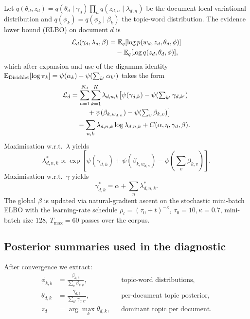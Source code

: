 \documentclass[11pt,a4paper]{article}
\begin{document}
Let $q(\theta_d, z_d) = q(\theta_d \mid \gamma_d) \prod_n q(z_{d,n}
\mid \lambda_{d,n})$ be the document-local variational distribution
and $q(\phi_k) = q(\phi_k \mid \beta_k)$ the topic-word distribution.
The evidence lower bound (ELBO) on document $d$ is
\begin{align}
\mathcal{L}_d(\gamma_d, \lambda_d, \beta)
&= \mathbb{E}_q[\log p(w_d, z_d, \theta_d, \phi)]
\nonumber\\
&\quad - \mathbb{E}_q[\log q(z_d, \theta_d, \phi)],
\end{align}
which after expansion and use of the digamma identity
$\mathbb{E}_{\mathrm{Dirichlet}}[\log \pi_k]
= \psi(\alpha_k) - \psi(\sum_{k'} \alpha_{k'})$ takes the form
\begin{align}
\mathcal{L}_d
&= \sum_{n=1}^{N_d} \sum_{k=1}^{K}
  \lambda_{d,n,k} \big[
    \psi(\gamma_{d,k}) - \psi(\textstyle\sum_{k'} \gamma_{d,k'})
\nonumber\\
&\hspace{2.5em} + \psi(\beta_{k, w_{d,n}})
   - \psi(\textstyle\sum_v \beta_{k,v})
  \big]
\nonumber\\
&\quad - \sum_{n,k} \lambda_{d,n,k} \log \lambda_{d,n,k}
+ C(\alpha, \eta, \gamma_d, \beta).
\label{eq:elbo}
\end{align}
Maximisation w.r.t.\ $\lambda$ yields
\begin{equation}
\lambda_{d,n,k}^* \propto
\exp\!\left[
  \psi(\gamma_{d,k}) + \psi(\beta_{k, w_{d,n}})
  - \psi(\textstyle\sum_v \beta_{k,v})
\right].
\label{eq:lambda-update}
\end{equation}
Maximisation w.r.t.\ $\gamma$ yields
\begin{equation}
\gamma_{d,k}^* = \alpha + \sum_n \lambda_{d,n,k}^*.
\label{eq:gamma-update}
\end{equation}
The global $\beta$ is updated via natural-gradient ascent on the
stochastic mini-batch ELBO with the learning-rate schedule
$\rho_t = (\tau_0 + t)^{-\kappa}$, $\tau_0 = 10, \kappa = 0.7$,
mini-batch size $128$, $T_{\max} = 60$ passes over the corpus.

\subsection{Posterior summaries used in the diagnostic}

After convergence we extract:
\begin{align}
\phi_{k,b} &= \frac{\beta_{k,b}}{\sum_{v} \beta_{k,v}},
&& \text{topic-word distributions,}
\\
\theta_{d,k} &= \frac{\gamma_{d,k}}{\sum_{k'} \gamma_{d,k'}},
&& \text{per-document topic posterior,}
\\
z_d &= \arg\max_k \theta_{d,k},
&& \text{dominant topic per document.}
\end{align}
\end{document}
